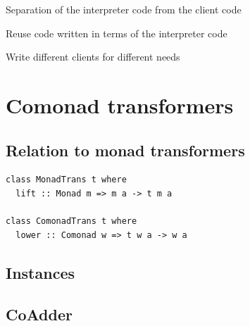 \documentclass{beamer}
\begin{document}
\begin{frame}[c]
  \centering
  Separation of the interpreter code from the client code
\end{frame}

\begin{frame}[c]
  \centering
  Reuse code written in terms of the interpreter code
\end{frame}

\begin{frame}[c]
  \centering
  Write different clients for different needs
\end{frame}

\section{Comonad transformers}

\subsection{Relation to monad transformers}

\begin{frame}[fragile]
  \begin{verbatim}
class MonadTrans t where
  lift :: Monad m => m a -> t m a

class ComonadTrans t where
  lower :: Comonad w => t w a -> w a
  \end{verbatim}
\end{frame}

\subsection{Instances}

\subsection{CoAdder}
\end{document}
